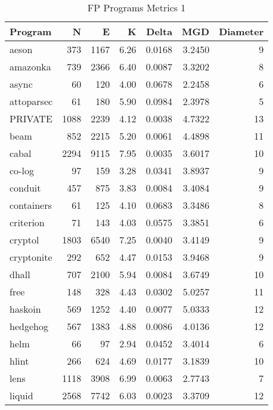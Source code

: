 \documentclass[12pt, a4paper]{article}
\begin{document}
\begin{longtable}[H]{l r r r r r r}
    \caption{FP Programs Metrics 1}\label{table:fp_metrics_1}\\
        Program &  N & E & K & Delta & MGD & Diameter\\
        \hline            
        \endhead
        aeson     &  373 &  1167  & 6.26 & 0.0168 & 3.2450 &  9 \\      
        amazonka  &  739 &  2366  & 6.40 & 0.0087 & 3.3202 &  8 \\      
        async     &   60 &   120  & 4.00 & 0.0678 & 2.2458 &  6 \\      
        attoparsec&   61 &   180  & 5.90 & 0.0984 & 2.3978 &  5 \\      
        PRIVATE   & 1088 &   2239 &  4.12&  0.0038&  4.7322&  13 \\      
        beam      &  852 &  2215  & 5.20 & 0.0061 & 4.4898 & 11 \\      
        cabal     & 2294 &  9115  & 7.95 & 0.0035 & 3.6017 & 10 \\      
        co-log    &   97 &   159  & 3.28 & 0.0341 & 3.8937 &  9 \\      
        conduit   &  457 &   875  & 3.83 & 0.0084 & 3.4084 &  9 \\      
        containers&   61 &   125  & 4.10 & 0.0683 & 3.3486 &  8 \\      
        criterion &   71 &   143  & 4.03 & 0.0575 & 3.3851 &  6 \\      
        cryptol   & 1803 &  6540  & 7.25 & 0.0040 & 3.4149 &  9 \\      
        cryptonite&  292 &   652  & 4.47 & 0.0153 & 3.9468 &  9 \\      
        dhall     &  707 &  2100  & 5.94 & 0.0084 & 3.6749 & 10 \\      
        free      &  148 &   328  & 4.43 & 0.0302 & 5.0257 & 11 \\      
        haskoin   &  569 &  1252  & 4.40 & 0.0077 & 5.0333 & 12 \\      
        hedgehog  &  567 &  1383  & 4.88 & 0.0086 & 4.0136 & 12 \\      
        helm      &   66 &    97  & 2.94 & 0.0452 & 3.4014 &  6 \\      
        hlint     &  266 &   624  & 4.69 & 0.0177 & 3.1839 & 10 \\      
        lens      & 1118 &  3908  & 6.99 & 0.0063 & 2.7743 &  7 \\      
        liquid    & 2568 &  7742  & 6.03 & 0.0023 & 3.3709 & 12 \\      

\end{longtable}
\end{document}

